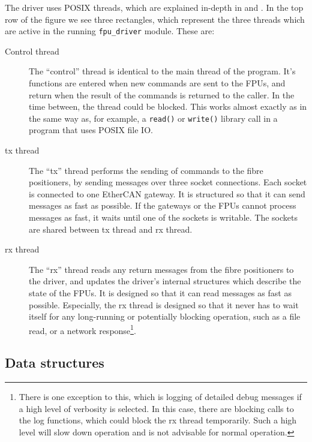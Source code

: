 \documentclass[fontsize=12,a4paper]{scrartcl}
\begin{document}
The driver uses POSIX threads, which are explained in-depth in \cite[chapters 29 - 33]{Kerrisk:TLPI}
and \cite[chapter 7]{Love:2013:LSP}.
In the top row of the figure we see three rectangles,
which represent the three threads which are active
in the running \texttt{fpu\_driver} module. These are:

\begin{description}
\item[Control thread] The ``control''  thread is identical to the main thread of
  the program. It's functions are entered when new commands are sent
  to the FPUs, and return when the result of the commands is returned
  to the caller. In the time between, the thread could be
  blocked. This works almost exactly as in the same way
  as, for example, a \texttt{read()} or \texttt{write()} library
  call in a program that uses POSIX file IO.


\item[tx thread] The ``tx'' thread performs the sending of commands to
  the fibre positioners, by sending messages over three socket
  connections. Each socket is connected to one EtherCAN gateway. It is
  structured so that it can send messages as fast as possible. If the
  gateways or the FPUs cannot process messages as fast, it waits until
  one of the sockets is writable. The sockets are shared between tx
  thread and rx thread.

\item[rx thread] The ``rx'' thread reads any return messages from the
  fibre positioners to the driver, and updates the driver's internal
  structures which describe the state of the FPUs. It is designed so
  that it can read messages as fast as possible. Especially, the rx
  thread is designed so that it never has to wait itself for any
  long-running or potentially blocking operation, such as a file read,
  or a network response\footnote{There is one exception to this, which
    is logging of detailed debug messages if a high level of verbosity
    is selected. In this case, there are blocking calls to the log
    functions, which could block the rx thread temporarily. Such a
    high level will slow down operation and is not advisable for
    normal operation.}.

\end{description}


\subsection{Data structures}
\end{document}
